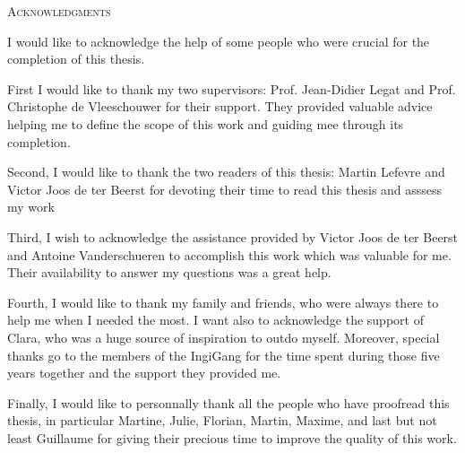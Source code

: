 \vspace*{\fill}
\begin{center}
    \huge{\textsc{Acknowledgments}}
    \end{center}
    
    I would like to acknowledge the help of some people who were crucial for the completion of this thesis.
    
    First I would like to thank my two supervisors: Prof. Jean-Didier Legat and Prof. Christophe de Vleeschouwer for their support. They provided valuable advice helping me to define the scope of this work and guiding mee through its completion.
    
    Second, I would like to thank the two readers of this thesis: Martin Lefevre and Victor Joos de ter Beerst for devoting their time to read this thesis and asssess my work
    
    Third, I wish to acknowledge the assistance provided by Victor Joos de ter Beerst and Antoine Vanderschueren to accomplish this work which was valuable for me. Their availability to answer my questions was a great help.
    
    Fourth, I would like to thank my family and friends, who were always there to help me when I needed the most. I want also to acknowledge the support of Clara, who was a huge source of inspiration to outdo myself. Moreover, special thanks go to the members of the IngiGang for the time spent during those five years together and the support they provided me.
    
    Finally, I would like to personnally thank all the people who have proofread this thesis, in particular Martine, Julie, Florian, Martin, Maxime, and last but not least Guillaume for giving their precious time to improve the quality of this work. 
\vspace*{\fill}
\afterpage{\blankpage}
\newpage
